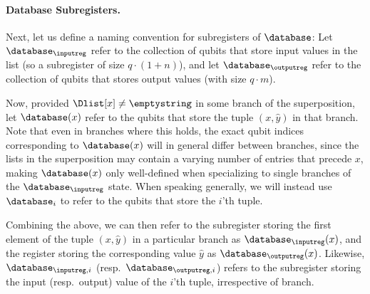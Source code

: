     \paragraph{Database Subregisters.}
      Next, let us define a naming convention for subregisters of $\database$:
        Let $\database_\inputreg$ refer to the collection of qubits that
        store input values in the list (so a subregister of size $q\cdot
        (1+n)$), and let $\database_\outputreg$ refer to the collection of
        qubits that stores output values (with size $q \cdot m$).

      Now, provided $\Dlist[x] \neq \emptystring$ in some branch of the
        superposition,
        let $\database(x)$ refer to the qubits that store the
        tuple $(x, \hat{y})$ in that branch. Note that even in branches where this
        holds, the exact qubit indices corresponding to
        $\database(x)$ will in general differ between branches, since the lists in the
        superposition may contain a varying number of entries that precede $x$,
        making $\database(x)$ only well-defined when specializing to single
        branches of the $\database_\inputreg$ state.
        When speaking generally, we will instead use $\database_i$ to refer to
        the qubits that store the $i$'th tuple.

      Combining the above, we can then refer to the subregister storing the first element of
        the tuple $(x,\hat y)$ in a particular branch as $\database_\inputreg(x)$, and the register
        storing the corresponding value $\hat{y}$ as
        $\database_\outputreg(x)$. Likewise, $\database_{\inputreg,i}$ (resp.\
        $\database_{\outputreg,i}$) refers to the subregister storing the input
        (resp.\ output) value of the $i$'th tuple, irrespective of branch.


